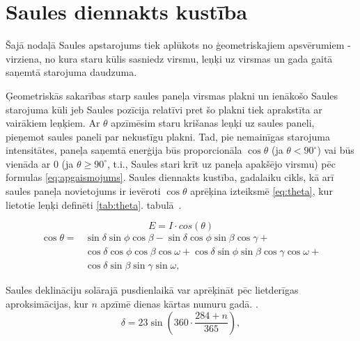
\section{Saules diennakts kustība}\label{section:kustiba}

Šajā nodaļā Saules apstarojums tiek aplūkots no ģeometriskajiem apsvērumiem - virziena, no kura staru kūlis sasniedz virsmu, leņķi uz virsmas un gada gaitā saņemtā starojuma daudzuma.

Ģeometriskās sakarības starp saules paneļa virsmas plakni un ienākošo Saules starojuma kūli jeb Saules pozīcija relatīvi pret šo plakni tiek aprakstīta ar vairākiem leņķiem. Ar $\theta$ apzīmēsim staru krišanas leņķi uz saules paneli, pieņemot saules paneli par nekustīgu plakni. Tad, pie nemainīgas starojuma intensitātes, paneļa saņemtā enerģija būs proporcionāla $\cos{\theta}$ (ja $\theta<90^\circ$) vai būs vienāda ar 0 (ja $\theta \geq 90^\circ$, t.i., Saules stari krīt uz paneļa apakšējo virsmu) pēc formulas \ref{eq:apgaismojums}. Saules diennakts kustība, gadalaiku cikls, kā arī saules paneļa novietojums ir ievēroti $\cos{\theta}$ aprēķina izteiksmē \ref{eq:theta}, kur lietotie leņķi definēti \ref{tab:theta}. tabulā~\cite{ThermalProcesses}.

\begin{equation}
\label{eq:apgaismojums}
E = I \cdot cos(\theta)
\end{equation}
\begin{equation}
\label{eq:theta}
\begin{aligned}
\cos{\theta} = {} & \sin{\delta} \sin{\phi} \cos{\beta} - \sin{\delta} \cos{\phi} \sin{\beta} \cos{\gamma} +                           \\
	& \cos{\delta} \cos{\phi} \cos{\beta} \cos{\omega} + \cos{\delta} \sin{\phi} \sin{\beta} \cos{\gamma} \cos{\omega} + \\
	& \cos{\delta} \sin{\beta} \sin{\gamma} \sin{\omega},
\end{aligned}
\end{equation}

Saules deklināciju solārajā pusdienlaikā var aprēķināt pēc lietderīgas aproksimācijas, kur $n$ apzīmē dienas kārtas numuru gadā. \cite{cooper1969}.
\begin{equation}
\label{eq:delta}
    \delta = 23 \sin \left( 360 \cdot \frac{284+n}{365} \right),
\end{equation}

